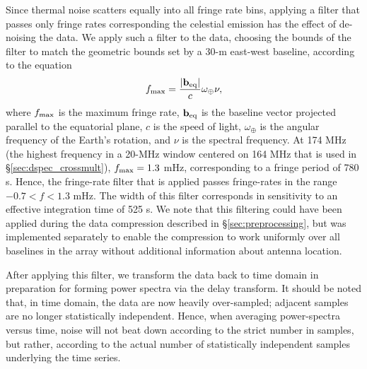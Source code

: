 \documentclass[twocolumn,numberedappendix]{emulateapj}
\def\b{\mathbf{b}}
\def\b{\mathbf{b}}
\begin{document}
Since thermal noise scatters equally into all fringe rate bins, applying a filter
that passes only fringe rates corresponding the celestial emission has the effect of de-noising the data.
We apply such a filter to the data, choosing the bounds of the filter to match the geometric
bounds set by a 30-m east-west baseline, according to the equation
\begin{equation}
f_{\rm max} = \frac{|\b_{\rm eq}|}{c} \omega_\oplus \nu,
\label{eq:fringe_rate}
\end{equation}
where $f_{\rm max}$ is the maximum fringe rate, 
$\b_{\rm eq}$ is the baseline vector projected parallel to the equatorial 
plane, $c$ is the speed of light,
$\omega_\oplus$ is the angular frequency of the Earth's rotation,
and $\nu$ is the spectral frequency. 
At 174 MHz (the highest frequency in a 20-MHz window centered on 164 MHz that is used in \S\ref{sec:dspec_crossmult}),
$f_{\rm max}=1.3$ mHz, corresponding to a fringe period of 780 s.  Hence, the fringe-rate filter that is
applied passes fringe-rates in the range $-0.7<f<1.3$ mHz.  The width of this filter corresponds in 
sensitivity to an effective integration time of 525 s.
We note that
this filtering could have been applied during the data compression described in \S\ref{sec:preprocessing},
but was implemented separately to enable the compression to work uniformly
over all baselines in the array without additional information about antenna location.

After applying this filter,
we transform the data back to time domain in preparation for forming power spectra via the delay transform.
It should be noted that, in time domain, the data are now heavily over-sampled; adjacent samples are no longer
statistically independent.  Hence, when averaging power-spectra versus time,
noise will not beat down according to the strict number in samples, but rather, according to
the actual number of statistically independent samples underlying the time series.
\end{document}
